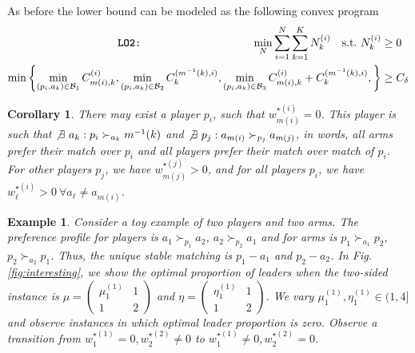 \documentclass{article}
\def\1{\bm{1}}
\newtheorem{example}[theorem]{Example}
\newtheorem{corollary}[theorem]{Corollary}
\begin{document}
As before the lower bound can be modeled as the following convex program
\begin{align*}
 \texttt{\textbf{LO2}:}\quad\quad \quad\quad \quad\quad \quad\quad \quad\quad  \min_{N}  \sum_{i=1}^N\sum_{k=1}^K N_k^{(i)} \quad  \text{s.t.}\ N^{(i)}_k&\geq 0\\
  \min\left\{\min_{(p_i,a_k)\in \mathcal{B}_1}C^{(i)}_{m(i),k},\min_{(p_i,a_k)\in \mathcal{B}_2}C^{(m^{-1}(k),i)}_{k},\min_{(p_i,a_k)\in \mathcal{B}_3}C^{(i)}_{m(i),k}+C^{(m^{-1}(k),i)}_{k},\right\}&\geq C_{\delta}
\end{align*}
\begin{corollary}
    There may exist a player $p_i$, such that $w^{\star (i)}_{m(i)}=0$. This player is such that $\not\exists\ a_k: p_i\succ_{a_k}m^{-1}(k)$ and $\not\exists\ p_j:a_{ m(i)}\succ_{p_j}a_{m(j)}$, in words, all arms prefer their match over $p_i$ and all players prefer their match over match of $p_i$. For other players $p_j$, we have $w^{\star (j)}_{m(j)}>0$, and for all players $p_i$, we have $w^{\star (i)}_{\ell}>0\ \forall a_{\ell}\neq a_{m(i)}$.
\end{corollary}

\begin{example} {\emph{
    Consider a toy example of two players and two arms. The preference profile for players is $a_1\succ_{p_1}a_2$, $a_2\succ_{p_2}a_1$ and for arms is $p_1\succ_{a_1}p_2$, $p_2\succ_{a_2}p_1$. Thus, the unique stable matching is $p_1-a_1$ and $p_2-a_2$. In Fig. \ref{fig:interesting}, we show the optimal proportion of leaders when the two-sided instance is $\mu=$\(
\left( \begin{smallmatrix} \mu^{(1)}_1 & 1\\1 & 2\end{smallmatrix} \right)
\) and $\eta=$\(
\left( \begin{smallmatrix} \eta^{(1)}_1 & 1\\1 & 2\end{smallmatrix} \right)
\).  We vary $\mu^{(1)}_1,\eta^{(1)}_1\in (1,4]$ and observe instances in which optimal leader proportion is zero. Observe a transition from $w^{\star(1)}_1=0,w^{\star(2)}_2\neq 0$ to $w^{\star(1)}_1\neq 0,w^{\star(2)}_2=0$.}} 
\label{ex:toy}
\end{example} 
\end{document}
